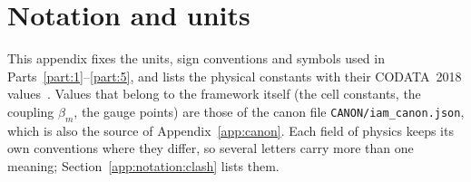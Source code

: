 \chapter{Notation and units}\label{app:notation}
This appendix fixes the units, sign conventions and symbols used in Parts~\ref{part:1}--\ref{part:5}, and lists the physical constants with their
CODATA~2018 values~\cite{CODATA2018}. Values that belong to the framework itself (the cell constants, the coupling $\beta_m$, the gauge points) are
those of the canon file \texttt{CANON/\allowbreak{}iam\_canon.json}, which is also the source of Appendix~\ref{app:canon}. Each field of physics keeps
its own conventions where they differ, so several letters carry more than one meaning; Section~\ref{app:notation:clash} lists them.

